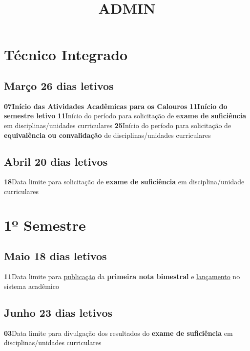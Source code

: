 \documentclass[thesis]{hmcposter}
\author{ }
\title{ADMIN}
\begin{document}
\begin{poster}
\normalsize\section{\color{hmcorange}Técnico Integrado}\subsection{Março \hfill 26 dias letivos}\textbf{07}\qquad \textbf{Início das Atividades Acadêmicas para os Calouros} \newline \null\textbf{11}\qquad \textbf{Início do semestre letivo} \newline \null\textbf{11}\qquad Início do período para solicitação de \textbf{exame de suficiência} em disciplinas/unidades curriculares \newline \null\textbf{25}\qquad Início do período para solicitação de \textbf{equivalência ou convalidação} de disciplinas/unidades curriculares \newline \null\subsection{Abril \hfill 20 dias letivos}\textbf{18}\qquad Data limite para solicitação de \textbf{exame de suficiência} em disciplina/unidade curriculares \newline \null\vfill\null
\columnbreak
\section{\hfill \color{hmcorange}1º Semestre}
\subsection{Maio \hfill 18 dias letivos}\textbf{11}\qquad Data limite para \underline{publicação} da \textbf{primeira nota bimestral} e \underline{lançamento} no sistema acadêmico \newline \null\subsection{Junho \hfill 23 dias letivos}\textbf{03}\qquad Data limite para divulgação dos resultados do \textbf{exame de suficiência} em disciplinas/unidades curriculares \newline \null\newpage

\end{poster}
\end{document}
